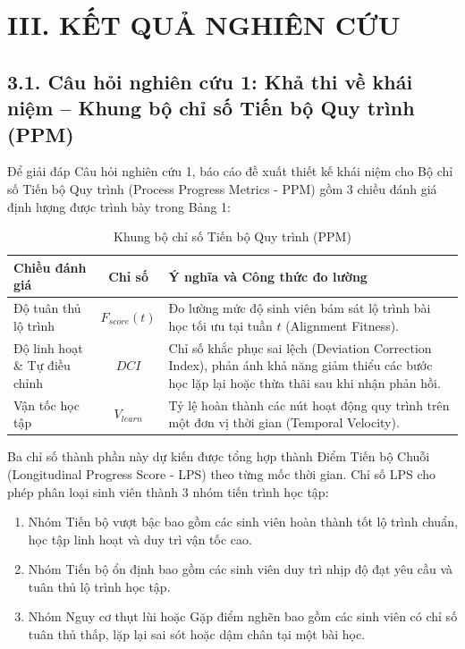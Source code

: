 \section{III. KẾT QUẢ NGHIÊN CỨU}

\subsection{3.1. Câu hỏi nghiên cứu 1: Khả thi về khái niệm -- Khung bộ chỉ số Tiến bộ Quy trình (PPM)}
Để giải đáp Câu hỏi nghiên cứu 1, báo cáo đề xuất thiết kế khái niệm cho Bộ chỉ số Tiến bộ Quy trình (Process Progress Metrics - PPM) gồm 3 chiều đánh giá định lượng được trình bày trong Bảng 1:

\begin{table}[h!]
\centering
\caption{Khung bộ chỉ số Tiến bộ Quy trình (PPM)}
\label{tab:ppm}
\begin{tabular}{>{\raggedright\arraybackslash}p{4cm} c >{\raggedright\arraybackslash}p{7.5cm}}
\toprule
\textbf{Chiều đánh giá} & \textbf{Chỉ số} & \textbf{Ý nghĩa và Công thức đo lường} \\
\midrule
Độ tuân thủ lộ trình & $F_{score}(t)$ & Đo lường mức độ sinh viên bám sát lộ trình bài học tối ưu tại tuần $t$ (Alignment Fitness). \\
\addlinespace
Độ linh hoạt \& Tự điều chỉnh & $DCI$ & Chỉ số khắc phục sai lệch (Deviation Correction Index), phản ánh khả năng giảm thiểu các bước học lặp lại hoặc thừa thãi sau khi nhận phản hồi. \\
\addlinespace
Vận tốc học tập & $V_{learn}$ & Tỷ lệ hoàn thành các nút hoạt động quy trình trên một đơn vị thời gian (Temporal Velocity). \\
\bottomrule
\end{tabular}
\end{table}

Ba chỉ số thành phần này dự kiến được tổng hợp thành Điểm Tiến bộ Chuỗi (Longitudinal Progress Score - LPS) theo từng mốc thời gian. Chỉ số LPS cho phép phân loại sinh viên thành 3 nhóm tiến trình học tập:
\begin{enumerate}
    \item Nhóm Tiến bộ vượt bậc bao gồm các sinh viên hoàn thành tốt lộ trình chuẩn, học tập linh hoạt và duy trì vận tốc cao.
    \item Nhóm Tiến bộ ổn định bao gồm các sinh viên duy trì nhịp độ đạt yêu cầu và tuân thủ lộ trình học tập.
    \item Nhóm Nguy cơ thụt lùi hoặc Gặp điểm nghẽn bao gồm các sinh viên có chỉ số tuân thủ thấp, lặp lại sai sót hoặc dậm chân tại một bài học.
\end{enumerate}

